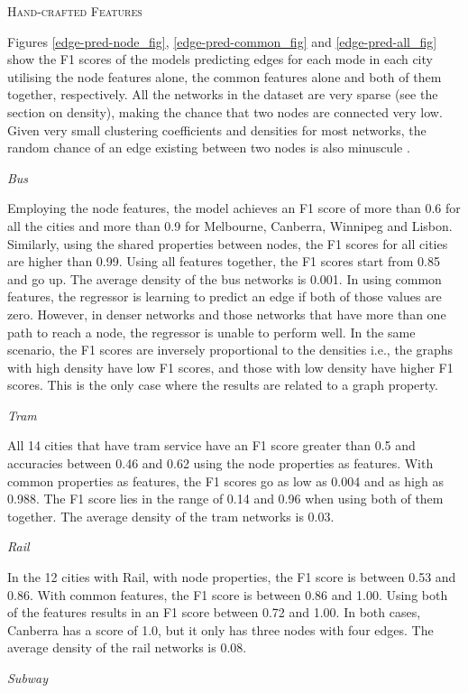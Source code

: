 \documentclass{article}
\theoremstyle{plain}
\theoremstyle{definition}
\theoremstyle{remark}
\begin{document}
\textsc{Hand-crafted Features}

Figures \ref{edge-pred-node_fig}, \ref{edge-pred-common_fig} and \ref{edge-pred-all_fig} show the F1 scores of the models predicting edges for each mode in each city utilising the node features alone, the common features alone and both of them together, respectively. All the networks in the dataset are very sparse (see the section on density), making the chance that two nodes are connected very low. Given very small clustering coefficients and densities for most networks, the random chance of an edge existing between two nodes is also minuscule \cite{frossard_2023b}.

\textit{Bus}

Employing the node features, the model achieves an F1 score of more than 0.6 for all the cities and more than 0.9 for Melbourne, Canberra, Winnipeg and Lisbon. Similarly, using the shared properties between nodes, the F1 scores for all cities are higher than 0.99. Using all features together, the F1 scores start from 0.85 and go up. The average density of the bus networks is 0.001. In using common features, the regressor is learning to predict an edge if both of those values are zero. However, in denser networks and those networks that have more than one path to reach a node, the regressor is unable to perform well. In the same scenario, the F1 scores are inversely proportional to the densities i.e., the graphs with high density have low F1 scores, and those with low density have higher F1 scores. This is the only case where the results are related to a graph property.

\textit{Tram}

All 14 cities that have tram service have an F1 score greater than 0.5 and accuracies between 0.46 and 0.62 using the node properties as features. With common properties as features, the F1 scores go as low as 0.004 and as high as 0.988. The F1 score lies in the range of 0.14 and 0.96 when using both of them together. The average density of the tram networks is 0.03.

\textit{Rail}

In the 12 cities with Rail, with node properties, the F1 score is between 0.53 and 0.86. With common features, the F1 score is between 0.86 and 1.00. Using both of the features results in an F1 score between 0.72 and 1.00. In both cases, Canberra has a score of 1.0, but it only has three nodes with four edges. The average density of the rail networks is 0.08.

\textit{Subway}
\end{document}

